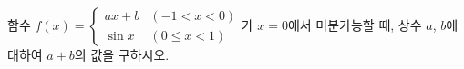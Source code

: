 함수 $f(x)=\begin{cases} ax+b & (-1<x<0) \\ \sin x & (0\le x<1) \end{cases}$가 $x=0$에서 미분가능할 때, 상수 $a$, $b$에 대하여 $a+b$의 값을 구하시오.

